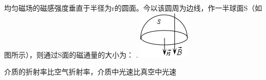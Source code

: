 \documentclass{njustexam}
\begin{document}
\begin{problem}
  均匀磁场的磁感强度垂直于半径为r的圆面。今以该圆周为边线，作一半球面S（如图所示），则通过S面的磁通量的大小为： .
    \includegraphics{Picture1.png}
\end{problem}






\begin{problem}
介质的折射率比空气折射率，介质中光速比真空中光速
\end{problem}







\end{document}
